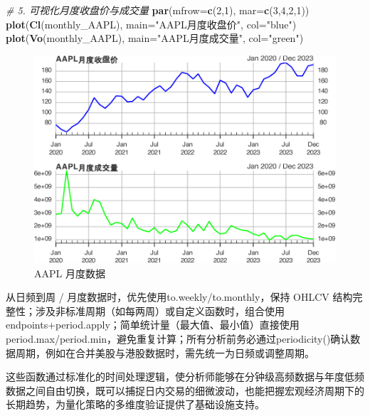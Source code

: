 \documentclass[]{ctexbook}
\newenvironment{Shaded}{\begin{snugshade}}{\end{snugshade}}
\newcommand{\AttributeTok}[1]{\textcolor[rgb]{0.13,0.29,0.53}{#1}}
\newcommand{\CommentTok}[1]{\textcolor[rgb]{0.56,0.35,0.01}{\textit{#1}}}
\newcommand{\DecValTok}[1]{\textcolor[rgb]{0.00,0.00,0.81}{#1}}
\newcommand{\FunctionTok}[1]{\textcolor[rgb]{0.13,0.29,0.53}{\textbf{#1}}}
\newcommand{\NormalTok}[1]{#1}
\newcommand{\StringTok}[1]{\textcolor[rgb]{0.31,0.60,0.02}{#1}}
\begin{document}
\begin{Shaded}
\begin{Highlighting}[]
\CommentTok{\# 5. 可视化月度收盘价与成交量}
\FunctionTok{par}\NormalTok{(}\AttributeTok{mfrow=}\FunctionTok{c}\NormalTok{(}\DecValTok{2}\NormalTok{,}\DecValTok{1}\NormalTok{), }\AttributeTok{mar=}\FunctionTok{c}\NormalTok{(}\DecValTok{3}\NormalTok{,}\DecValTok{4}\NormalTok{,}\DecValTok{2}\NormalTok{,}\DecValTok{1}\NormalTok{))}
\FunctionTok{plot}\NormalTok{(}\FunctionTok{Cl}\NormalTok{(monthly\_AAPL), }\AttributeTok{main=}\StringTok{"AAPL月度收盘价"}\NormalTok{, }\AttributeTok{col=}\StringTok{"blue"}\NormalTok{)}
\FunctionTok{plot}\NormalTok{(}\FunctionTok{Vo}\NormalTok{(monthly\_AAPL), }\AttributeTok{main=}\StringTok{"AAPL月度成交量"}\NormalTok{, }\AttributeTok{col=}\StringTok{"green"}\NormalTok{)}
\end{Highlighting}
\end{Shaded}

\begin{figure}
\includegraphics[width=0.9\linewidth]{QuantmodHandbook_files/figure-latex/vismaxvol-1} \caption{AAPL 月度数据}\label{fig:vismaxvol}
\end{figure}

从日频到周 / 月度数据时，优先使用to.weekly/to.monthly，保持 OHLCV 结构完整性；涉及非标准周期（如每两周）或自定义函数时，组合使用endpoints+period.apply；简单统计量（最大值、最小值）直接使用period.max/period.min，避免重复计算；所有分析前务必通过periodicity()确认数据周期，例如在合并美股与港股数据时，需先统一为日频或调整周期。

这些函数通过标准化的时间处理逻辑，使分析师能够在分钟级高频数据与年度低频数据之间自由切换，既可以捕捉日内交易的细微波动，也能把握宏观经济周期下的长期趋势，为量化策略的多维度验证提供了基础设施支持。
\end{document}

